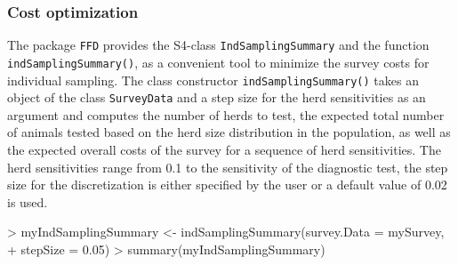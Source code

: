 \documentclass[nojss]{jss}
\begin{document}
\subsubsection{Cost optimization}

The package \texttt{FFD} provides the S4-class
\texttt{IndSamplingSummary}
 and the function
\texttt{indSamplingSummary()}, 
as a convenient tool to minimize the survey costs for individual
sampling. The class constructor \texttt{indSamplingSummary()} takes
an object of the class \texttt{SurveyData} and a step size for the
herd sensitivities as an argument and computes the number of herds
to test, the expected total number of animals tested based on the
herd size distribution in the population, as well as the expected
overall costs of the survey for a sequence of herd sensitivities. The
herd sensitivities range from 0.1 to the sensitivity of the
diagnostic test, the step size for the discretization is either
specified by the user or a default value of 0.02 is used.

\begin{Schunk}
\begin{Sinput}
> myIndSamplingSummary <- indSamplingSummary(survey.Data = mySurvey, 
+      stepSize = 0.05)
> summary(myIndSamplingSummary)
\end{Sinput}
\end{Schunk}
\end{document}

